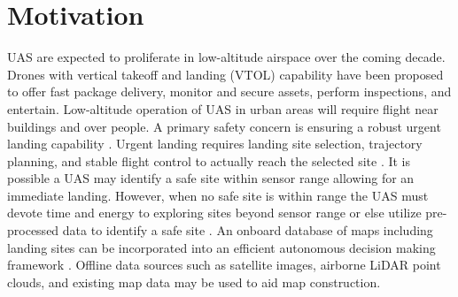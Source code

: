 
\section{Motivation}

\acf{UAS} are expected to proliferate in low-altitude airspace over the coming decade. Drones with vertical takeoff and landing (VTOL) capability have been proposed to offer fast package delivery, monitor and secure assets, perform inspections, and entertain.
Low-altitude operation of UAS in urban areas will require flight near buildings and over people. 
A primary safety concern is ensuring a robust urgent landing capability \cite{winnefeld_unmanned_2011,degarmo_issues_2013}.  Urgent landing requires landing site selection, trajectory planning, and stable flight control to actually reach the selected site \cite{atkins_emergency_2006}. It is possible a \ac{UAS} may identify a safe site within sensor range allowing for an immediate landing.  However, when no safe site is within range the UAS must devote time and energy to exploring sites beyond sensor range or else utilize pre-processed data to identify a safe site \cite{ten_harmsel_emergency_2017,ochoa_fail-safe_2017}.  An onboard database of maps including landing sites can be incorporated into an efficient autonomous decision making framework \cite{sankararaman_towards_2017}. Offline data sources such as satellite images, airborne LiDAR point clouds, and existing map data may be used to aid map construction.

